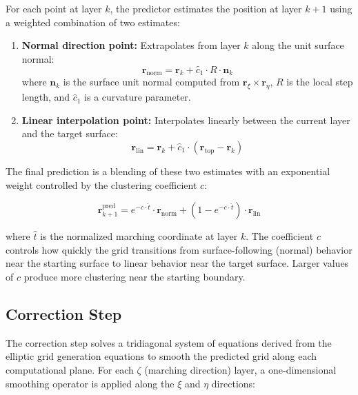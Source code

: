 \documentclass[11pt,a4paper]{report}
\newcommand{\rvec}{\bm{r}}
\newcommand{\nvec}{\bm{n}}
\begin{document}
For each point at layer $k$, the predictor estimates the position at layer $k+1$ using a weighted combination of two estimates:

\begin{enumerate}
    \item \textbf{Normal direction point:} Extrapolates from layer $k$ along the unit surface normal:
    \begin{equation}
        \rvec_{\text{norm}} = \rvec_k + \hat{c}_1 \cdot R \cdot \nvec_k
    \end{equation}
    where $\nvec_k$ is the surface unit normal computed from $\rvec_\xi \times \rvec_\eta$, $R$ is the local step length, and $\hat{c}_1$ is a curvature parameter.

    \item \textbf{Linear interpolation point:} Interpolates linearly between the current layer and the target surface:
    \begin{equation}
        \rvec_{\text{lin}} = \rvec_k + \hat{c}_1 \cdot (\rvec_{\text{top}} - \rvec_k)
    \end{equation}
\end{enumerate}

The final prediction is a blending of these two estimates with an exponential weight controlled by the clustering coefficient $c$:

\begin{equation}
    \rvec_{k+1}^{\text{pred}} = e^{-c \cdot \hat{t}} \cdot \rvec_{\text{norm}} + (1 - e^{-c \cdot \hat{t}}) \cdot \rvec_{\text{lin}}
\end{equation}

where $\hat{t}$ is the normalized marching coordinate at layer $k$. The coefficient $c$ controls how quickly the grid transitions from surface-following (normal) behavior near the starting surface to linear behavior near the target surface. Larger values of $c$ produce more clustering near the starting boundary.

\subsection{Correction Step}

The correction step solves a tridiagonal system of equations derived from the elliptic grid generation equations to smooth the predicted grid along each computational plane. For each $\zeta$ (marching direction) layer, a one-dimensional smoothing operator is applied along the $\xi$ and $\eta$ directions:
\end{document}
